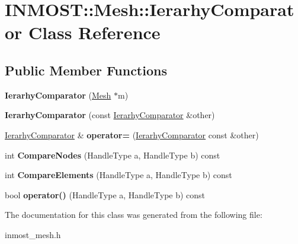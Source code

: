 \hypertarget{classINMOST_1_1Mesh_1_1IerarhyComparator}{\section{I\-N\-M\-O\-S\-T\-:\-:Mesh\-:\-:Ierarhy\-Comparator Class Reference}
\label{classINMOST_1_1Mesh_1_1IerarhyComparator}
}
\subsection*{Public Member Functions}
\begin{DoxyCompactItemize}
\item 
\hypertarget{classINMOST_1_1Mesh_1_1IerarhyComparator_aa1aace576057479c4c766a80c3f1c05b}{{\bfseries Ierarhy\-Comparator} (\hyperlink{classINMOST_1_1Mesh}{Mesh} $\ast$m)}\label{classINMOST_1_1Mesh_1_1IerarhyComparator_aa1aace576057479c4c766a80c3f1c05b}

\item 
\hypertarget{classINMOST_1_1Mesh_1_1IerarhyComparator_a26ad54ab39301f8adc84b42b744719e8}{{\bfseries Ierarhy\-Comparator} (const \hyperlink{classINMOST_1_1Mesh_1_1IerarhyComparator}{Ierarhy\-Comparator} \&other)}\label{classINMOST_1_1Mesh_1_1IerarhyComparator_a26ad54ab39301f8adc84b42b744719e8}

\item 
\hypertarget{classINMOST_1_1Mesh_1_1IerarhyComparator_a7b467f71e87b62ba9440cfbe3cbc1bcc}{\hyperlink{classINMOST_1_1Mesh_1_1IerarhyComparator}{Ierarhy\-Comparator} \& {\bfseries operator=} (\hyperlink{classINMOST_1_1Mesh_1_1IerarhyComparator}{Ierarhy\-Comparator} const \&other)}\label{classINMOST_1_1Mesh_1_1IerarhyComparator_a7b467f71e87b62ba9440cfbe3cbc1bcc}

\item 
\hypertarget{classINMOST_1_1Mesh_1_1IerarhyComparator_a586cefae2bce4e04fedbf7e767eff555}{int {\bfseries Compare\-Nodes} (Handle\-Type a, Handle\-Type b) const }\label{classINMOST_1_1Mesh_1_1IerarhyComparator_a586cefae2bce4e04fedbf7e767eff555}

\item 
\hypertarget{classINMOST_1_1Mesh_1_1IerarhyComparator_ad8ec126d5fa88d41da914c31e9b8fe81}{int {\bfseries Compare\-Elements} (Handle\-Type a, Handle\-Type b) const }\label{classINMOST_1_1Mesh_1_1IerarhyComparator_ad8ec126d5fa88d41da914c31e9b8fe81}

\item 
\hypertarget{classINMOST_1_1Mesh_1_1IerarhyComparator_ad98a25c830e36605854a0cfb3415c761}{bool {\bfseries operator()} (Handle\-Type a, Handle\-Type b) const }\label{classINMOST_1_1Mesh_1_1IerarhyComparator_ad98a25c830e36605854a0cfb3415c761}

\end{DoxyCompactItemize}


The documentation for this class was generated from the following file\-:\begin{DoxyCompactItemize}
\item 
inmost\-\_\-mesh.\-h\end{DoxyCompactItemize}
